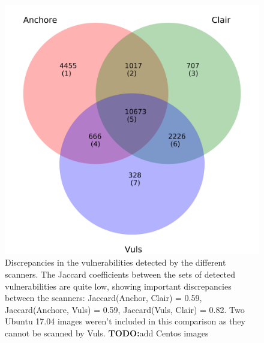 \documentclass[a4paper,num-refs]{oup-contemporary}
\newcommand{\todo}[1]{\color{red}\textbf{TODO:}#1\color{black}}
\begin{document}
	\begin{figure}
        \includegraphics[width=\columnwidth]{Figures/venn.pdf}
	\caption{\label{fig:venn} Discrepancies in the vulnerabilities detected
	by the different scanners. The Jaccard coefficients between the sets of
	detected vulnerabilities are quite low, showing important discrepancies
	between the scanners: Jaccard(Anchor, Clair) = 0.59, Jaccard(Anchore, Vuls) =
	0.59, Jaccard(Vuls, Clair) = 0.82. Two Ubuntu 17.04 images weren't included in this comparison as they cannot be scanned by Vuls. \todo{add Centos images}}
\end{figure}
\end{document}
